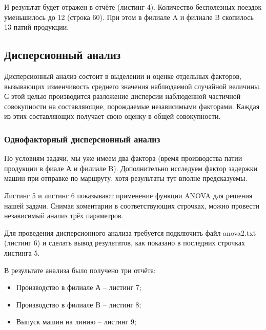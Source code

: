 \documentclass[a4paper, 12pt]{article}        %
\begin{document}


И результат будет отражен в отчёте (листинг 4). Количество бесполезных поездок уменьшилось до 12 (строка 60). При этом в филиале A и филиале B скопилось 13 патий продукции.



\newpage
\subsection{Дисперсионный анализ}

Дисперсионный анализ состоит в выделении и оценке отдельных факторов, вызывающих изменчивость среднего значения наблюдаемой случайной величины. С этой целью производится разложение дисперсии наблюденной частичной совокупности на составляющие, порождаемые независимыми факторами. Каждая из этих составляющих получает свою оценку в общей совокупности.

\subsubsection{Однофакторный дисперсионный анализ}

По условиям задачи, мы уже имеем два фактора (время производства патии продукции в фиале А и филиале B). Дополнительно исследуем фактор задержки машин при отправке по маршруту, хотя результаты тут вполне предсказуемы.

Листинг 5 и листинг 6 показывают применение функции ANOVA для решения нашей задачи. Снимая коментарии в соответствующих строчках, можно провести независимый анализ трёх параметров.



Для проведения дисперсионного анализа требуется подключить файл anova2.txt (листинг 6) и сделать вывод результатов, как показано в последних строчках листинга 5.



В результате анализа было получено три отчёта:
\begin{itemize}
\item Производство в филиале А -- листинг 7;
\item Производство в филиале B -- листинг 8;
\item Выпуск машин на линию -- листинг 9;
\end{itemize}
\end{document}
